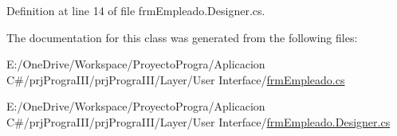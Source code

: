 Definition at line 14 of file frm\+Empleado.\+Designer.\+cs.



The documentation for this class was generated from the following files\+:\begin{DoxyCompactItemize}
\item 
E\+:/\+One\+Drive/\+Workspace/\+Proyecto\+Progra/\+Aplicacion C\#/prj\+Progra\+I\+I\+I/prj\+Progra\+I\+I\+I/\+Layer/\+User Interface/\hyperlink{frm_empleado_8cs}{frm\+Empleado.\+cs}\item 
E\+:/\+One\+Drive/\+Workspace/\+Proyecto\+Progra/\+Aplicacion C\#/prj\+Progra\+I\+I\+I/prj\+Progra\+I\+I\+I/\+Layer/\+User Interface/\hyperlink{frm_empleado_8_designer_8cs}{frm\+Empleado.\+Designer.\+cs}\end{DoxyCompactItemize}
